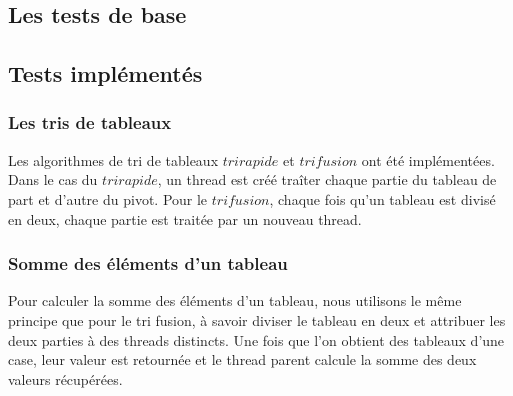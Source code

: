 \subsection{Les tests de base}
\subsection{Tests implémentés}

\subsubsection{Les tris de tableaux}
Les algorithmes de tri de tableaux $tri rapide$ et $tri fusion$ ont été implémentées. Dans le cas du $tri rapide$, un thread est créé traîter chaque partie du tableau de part et d'autre du pivot. Pour le $tri fusion$, chaque fois qu'un tableau est divisé en deux, chaque partie est traitée par un nouveau thread.\\



\subsubsection{Somme des éléments d'un tableau}
Pour calculer la somme des éléments d'un tableau, nous utilisons le même principe que pour le tri fusion, à savoir diviser le tableau en deux et attribuer les deux parties à des threads distincts. Une fois que l'on obtient des tableaux d'une case, leur valeur est retournée et le thread parent calcule la somme des deux valeurs récupérées.


